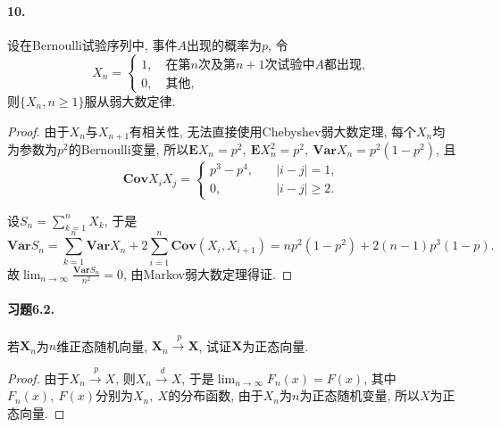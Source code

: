 \documentclass[12pt, a4paper, oneside]{ctexart}
\let\geq=\geqslant %
\def\bd{\boldsymbol}        %
\def\pra{\xrightarrow{\ \ p\ }}     %
\def\dra{\xrightarrow{\ \ d\ }}     %
\def\E{\textbf{E}}      %
\def\var{\textbf{Var}}  %
\def\cov{\textbf{Cov}}  %
\begin{document}
\paragraph*{10.}设在Bernoulli试验序列中, 事件$A$出现的概率为$p$, 令
\begin{equation*}
    X_n=\begin{cases}
        1,\quad\text{在第}n\text{次及第}n+1\text{次试验中}A\text{都出现},\\
        0,\quad\text{其他},
    \end{cases}
\end{equation*}
则$\{X_n,n\geq 1\}$服从弱大数定律.
\begin{proof}
    由于$X_n$与$X_{n+1}$有相关性, 无法直接使用Chebyshev弱大数定理, 每个$X_n$均为参数为$p^2$的Bernoulli变量, 所以$\E X_n = p^2,\ \E X_n^2 = p^2,\ \var X_n = p^2(1-p^2)$, 且
    \begin{equation*}
    \cov X_iX_j = \begin{cases}
        p^3 - p^4,&\quad |i-j| = 1,\\
        0,&\quad |i-j| \geq 2.
    \end{cases}
    \end{equation*}
    
    设$S_n = \sum_{k=1}^nX_k$, 于是
    \begin{equation*}
        \var S_n = \sum_{k=1}^n\var X_n + 2\sum_{i=1}^n\cov(X_i,X_{i+1}) = np^2(1-p^2) + 2(n-1)p^3(1-p).
    \end{equation*}
    故$\lim_{n\to\infty}\frac{\var S_n}{n^2} = 0$, 由Markov弱大数定理得证.
\end{proof}

\paragraph*{习题6.2.}若$\bd{X}_n$为$n$维正态随机向量, $\bd{X}_n\pra \bd{X}$, 试证$\bd{X}$为正态向量.
\begin{proof}
    由于$X_n\pra X$, 则$X_n\dra X$, 于是$\lim_{n\to\infty}F_n(x) = F(x)$, 其中$F_n(x),\ F(x)$分别为$X_n,\ X$的分布函数, 由于$X_n$为$n$为正态随机变量, 所以$X$为正态向量.
\end{proof}
\end{document}
